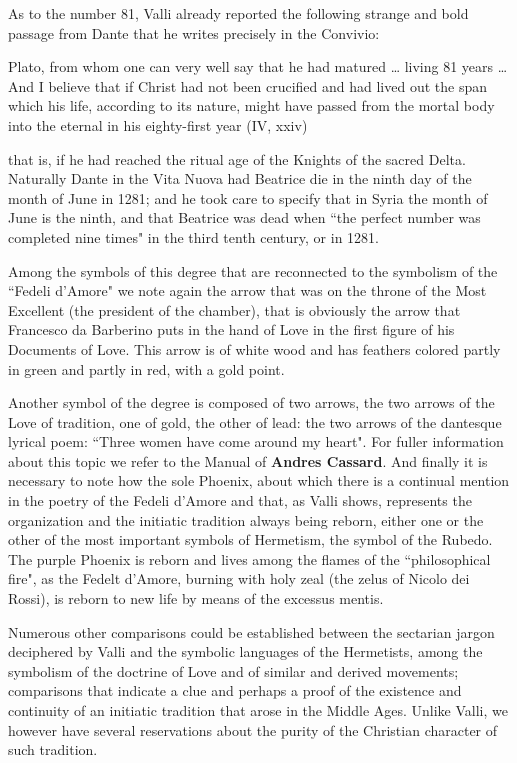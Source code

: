 As to the number 81, Valli already reported the following strange and bold passage from Dante that he writes precisely in the Convivio:

\begin{quotex}
Plato, from whom one can very well say that he had matured … living 81 years … And I believe that if Christ had not been crucified and had lived out the span which his life, according to its nature, might have passed from the mortal body into the eternal in his eighty-first year (IV, xxiv)

\end{quotex}
that is, if he had reached the ritual age of the Knights of the sacred Delta. Naturally Dante in the Vita Nuova had Beatrice die in the ninth day of the month of June in 1281; and he took care to specify that in Syria the month of June is the ninth, and that Beatrice was dead when ``the perfect number was completed nine times" in the third tenth century, or in 1281.

Among the symbols of this degree that are reconnected to the symbolism of the ``Fedeli d'Amore" we note again the arrow that was on the throne of the Most Excellent (the president of the chamber), that is obviously the arrow that Francesco da Barberino puts in the hand of Love in the first figure of his Documents of Love. This arrow is of white wood and has feathers colored partly in green and partly in red, with a gold point.

Another symbol of the degree is composed of two arrows, the two arrows of the Love of tradition, one of gold, the other of lead: the two arrows of the dantesque lyrical poem: ``Three women have come around my heart". For fuller information about this topic we refer to the Manual of \textbf{Andres Cassard}. And finally it is necessary to note how the sole Phoenix, about which there is a continual mention in the poetry of the Fedeli d'Amore and that, as Valli shows, represents the organization and the initiatic tradition always being reborn, either one or the other of the most important symbols of Hermetism, the symbol of the Rubedo. The purple Phoenix is reborn and lives among the flames of the ``philosophical fire", as the Fedelt d'Amore, burning with holy zeal (the zelus of Nicolo dei Rossi), is reborn to new life by means of the excessus mentis.

Numerous other comparisons could be established between the sectarian jargon deciphered by Valli and the symbolic languages of the Hermetists, among the symbolism of the doctrine of Love and of similar and derived movements; comparisons that indicate a clue and perhaps a proof of the existence and continuity of an initiatic tradition that arose in the Middle Ages. Unlike Valli, we however have several reservations about the purity of the Christian character of such tradition.

